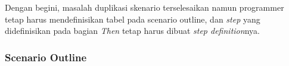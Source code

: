 Dengan begini, masalah duplikasi skenario terselesaikan namun programmer tetap
harus mendefinisikan tabel pada scenario outline, dan \textit{step} yang didefinisikan
pada bagian \textit{Then} tetap harus dibuat \textit{step definition}nya.

\subsubsection{Scenario Outline}






